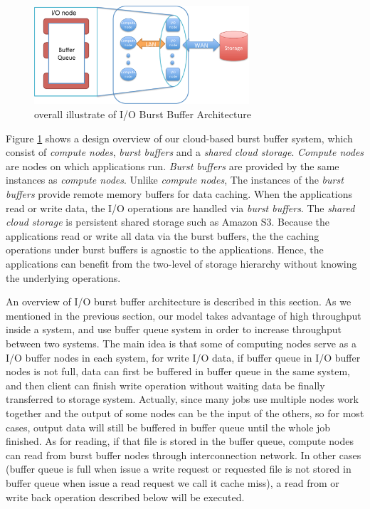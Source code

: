 \begin{figure}[tb]
	\centering
	\includegraphics[width=8cm]{img/architecture_overview}
	\caption{overall illustrate of I/O Burst Buffer Architecture}
	\label{architecture:overview}
\end{figure}

Figure \ref{architecture:overview} shows a design overview of our cloud-based
burst buffer system, which consist of \emph{compute nodes}, \emph{burst buffers}
and a \emph{shared cloud storage}. \emph{Compute nodes} are nodes on which
applications run. \emph{Burst buffers} are provided by the same instances
as \emph{compute nodes}. Unlike \emph{compute nodes}, The instances
of the \emph{burst buffers} provide remote memory buffers for data caching.
When the applications read or write data, the I/O operations are handled via
\emph{burst buffers}.  The \emph{shared cloud storage} is persistent shared storage such as Amazon S3.
Because the applications read or write all data via the burst buffers, the
the caching operations under burst buffers is agnostic to the applications.
Hence, the applications can benefit from the two-level of storage hierarchy
without knowing the underlying operations.
 
An overview of I/O burst buffer architecture is described in this section.
As we mentioned in the previous section, our model takes advantage of high
throughput inside a system, and use buffer queue system in order to increase
throughput between two systems.
The main idea is that some of computing nodes serve as a I/O buffer nodes in
each system, for write I/O data, if buffer queue in I/O buffer nodes is not
full, data can first be buffered in buffer queue in the same system, and then
client can finish write operation without waiting data be finally transferred
to storage system.
Actually, since many jobs use multiple nodes work together and the output of
some nodes can be the input of the others, so for most cases, output data will
still be buffered in buffer queue until the whole job finished.
As for reading, if that file is stored in the buffer queue, compute nodes can
read from burst buffer nodes through interconnection network.
In other cases (buffer queue is full when issue a write request or requested
file is not stored in buffer queue when issue a read request we call it cache
miss), a read from or write back operation described below will be executed.

